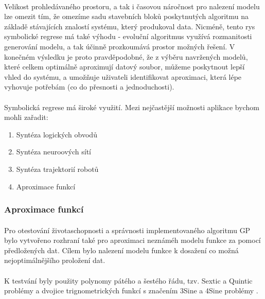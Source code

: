 \documentclass[bc,male,java,dept460]{diploma}		%
\begin{document}
\paragraph*{}
Velikost prohledávaného prostoru, a tak i časovou náročnost pro nalezení modelu lze omezit tím, že omezíme sadu stavebních bloků poskytnutých algoritmu na základě stávajících znalostí systému, který produkoval data. Nicméně, tento rys symbolické regrese má také výhodu - evoluční algoritmus využívá rozmanitosti generování modelu, a tak účinně prozkoumává prostor možných řešení. V konečném výsledku je proto pravděpodobné, že z výběru navržených modelů, které celkem optimálně aproximují datový soubor, můžeme poskytnout lepší vhled do systému, a umožňuje uživateli identifikovat aproximaci, která lépe vyhovuje potřebám (co do přesnosti a jednoduchosti).

\paragraph*{}
Symbolická regrese má široké využití. Mezi nejčastější možnosti aplikace bychom mohli zařadit:
\begin{enumerate}
\item Syntéza logických obvodů
\item Syntéza neuroových sítí
\item Syntéza trajektorií robotů
\item Aproximace funkcí
\end{enumerate}

\subsubsection{Aproximace funkcí}
\paragraph*{}
Pro otestování životaschopnosti a správnosti implementovaného algoritmu GP bylo vytvořeno rozhraní také pro aproximaci neznáméh modelu funkce za pomocí předložených dat. Cílem bylo nalezení modelu funkce k dosažení co možná nejoptimálnějšího proložení dat.

\paragraph*{}
K testvání byly použity polynomy pátého a šestého řádu, tzv. Sextic a Quintic problémy a dvojice trignometrických funkcí s značením 3Sine a 4Sine problémy \cite{evolvyptech}.
\end{document}
